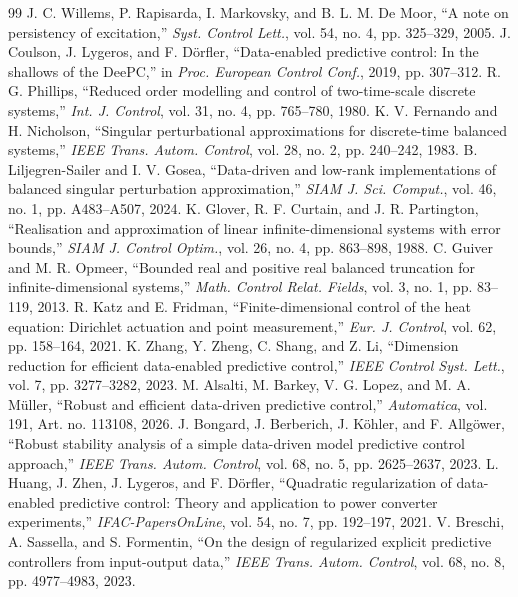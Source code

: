 \documentclass[letterpaper,10pt,conference]{ieeeconf}
\theoremstyle{remark}\newtheorem{remark}{Remark}
\begin{document}
\begin{thebibliography}{99}
 J. C. Willems, P. Rapisarda, I. Markovsky, and B. L. M. De Moor, ``A note on persistency of excitation,'' \emph{Syst. Control Lett.}, vol. 54, no. 4, pp. 325--329, 2005.
 J. Coulson, J. Lygeros, and F. D\"orfler, ``Data-enabled predictive control: In the shallows of the DeePC,'' in \emph{Proc. European Control Conf.}, 2019, pp. 307--312.
 R. G. Phillips, ``Reduced order modelling and control of two-time-scale discrete systems,'' \emph{Int. J. Control}, vol. 31, no. 4, pp. 765--780, 1980.
 K. V. Fernando and H. Nicholson, ``Singular perturbational approximations for discrete-time balanced systems,'' \emph{IEEE Trans. Autom. Control}, vol. 28, no. 2, pp. 240--242, 1983.
 B. Liljegren-Sailer and I. V. Gosea, ``Data-driven and low-rank implementations of balanced singular perturbation approximation,'' \emph{SIAM J. Sci. Comput.}, vol. 46, no. 1, pp. A483--A507, 2024.
 K. Glover, R. F. Curtain, and J. R. Partington, ``Realisation and approximation of linear infinite-dimensional systems with error bounds,'' \emph{SIAM J. Control Optim.}, vol. 26, no. 4, pp. 863--898, 1988.
 C. Guiver and M. R. Opmeer, ``Bounded real and positive real balanced truncation for infinite-dimensional systems,'' \emph{Math. Control Relat. Fields}, vol. 3, no. 1, pp. 83--119, 2013.
 R. Katz and E. Fridman, ``Finite-dimensional control of the heat equation: Dirichlet actuation and point measurement,'' \emph{Eur. J. Control}, vol. 62, pp. 158--164, 2021.
 K. Zhang, Y. Zheng, C. Shang, and Z. Li, ``Dimension reduction for efficient data-enabled predictive control,'' \emph{IEEE Control Syst. Lett.}, vol. 7, pp. 3277--3282, 2023.
 M. Alsalti, M. Barkey, V. G. Lopez, and M. A. M\"uller, ``Robust and efficient data-driven predictive control,'' \emph{Automatica}, vol. 191, Art. no. 113108, 2026.
 J. Bongard, J. Berberich, J. K\"ohler, and F. Allg\"ower, ``Robust stability analysis of a simple data-driven model predictive control approach,'' \emph{IEEE Trans. Autom. Control}, vol. 68, no. 5, pp. 2625--2637, 2023.
 L. Huang, J. Zhen, J. Lygeros, and F. D\"orfler, ``Quadratic regularization of data-enabled predictive control: Theory and application to power converter experiments,'' \emph{IFAC-PapersOnLine}, vol. 54, no. 7, pp. 192--197, 2021.
 V. Breschi, A. Sassella, and S. Formentin, ``On the design of regularized explicit predictive controllers from input-output data,'' \emph{IEEE Trans. Autom. Control}, vol. 68, no. 8, pp. 4977--4983, 2023.
\end{thebibliography}
\end{document}
